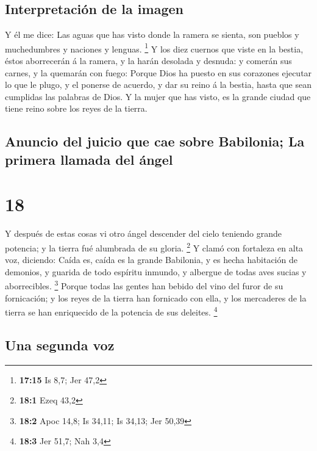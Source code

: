 \hypertarget{interpretaciuxf3n-de-la-imagen}{%
\subsection{Interpretación de la
imagen}\label{interpretaciuxf3n-de-la-imagen}}

 Y él me dice: Las aguas que has visto donde la ramera se
sienta, son pueblos y muchedumbres y naciones y lenguas. \footnote{\textbf{17:15}
  Is 8,7; Jer 47,2}  Y los diez cuernos que viste en la
bestia, éstos aborrecerán á la ramera, y la harán desolada y desnuda: y
comerán sus carnes, y la quemarán con fuego:  Porque Dios
ha puesto en sus corazones ejecutar lo que le plugo, y el ponerse de
acuerdo, y dar su reino á la bestia, hasta que sean cumplidas las
palabras de Dios.  Y la mujer que has visto, es la grande
ciudad que tiene reino sobre los reyes de la tierra.

\hypertarget{anuncio-del-juicio-que-cae-sobre-babilonia-la-primera-llamada-del-uxe1ngel}{%
\subsection{Anuncio del juicio que cae sobre Babilonia; La primera
llamada del
ángel}\label{anuncio-del-juicio-que-cae-sobre-babilonia-la-primera-llamada-del-uxe1ngel}}

\hypertarget{section-17}{%
\section{18}\label{section-17}}

 Y después de estas cosas vi otro ángel descender del
cielo teniendo grande potencia; y la tierra fué alumbrada de su gloria.
\footnote{\textbf{18:1} Ezeq 43,2}  Y clamó con fortaleza
en alta voz, diciendo: Caída es, caída es la grande Babilonia, y es
hecha habitación de demonios, y guarida de todo espíritu inmundo, y
albergue de todas aves sucias y aborrecibles. \footnote{\textbf{18:2}
  Apoc 14,8; Is 34,11; Is 34,13; Jer 50,39}  Porque todas
las gentes han bebido del vino del furor de su fornicación; y los reyes
de la tierra han fornicado con ella, y los mercaderes de la tierra se
han enriquecido de la potencia de sus deleites. \footnote{\textbf{18:3}
  Jer 51,7; Nah 3,4}

\hypertarget{una-segunda-voz}{%
\subsection{Una segunda voz}\label{una-segunda-voz}}


